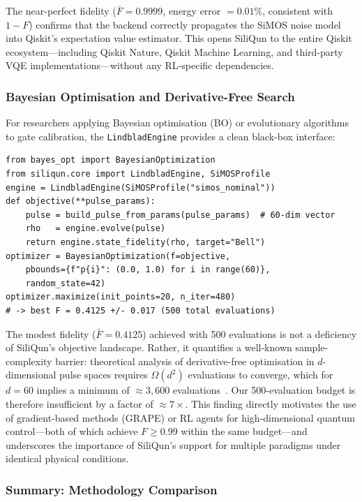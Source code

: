 The near-perfect fidelity ($\bar{F} = 0.9999$, energy error $= 0.01\%$, consistent with $1 - F$) confirms
that the backend correctly propagates the SiMOS noise model into Qiskit's expectation
value estimator. This opens SiliQun to the entire Qiskit ecosystem---including
Qiskit Nature, Qiskit Machine Learning, and third-party VQE implementations---without
any RL-specific dependencies.

\subsubsection{Bayesian Optimisation and Derivative-Free Search}

For researchers applying Bayesian optimisation (BO) or evolutionary algorithms to
gate calibration, the \texttt{LindbladEngine} provides a clean black-box interface:

\begin{verbatim}
from bayes_opt import BayesianOptimization
from siliqun.core import LindbladEngine, SiMOSProfile
engine = LindbladEngine(SiMOSProfile("simos_nominal"))
def objective(**pulse_params):
    pulse = build_pulse_from_params(pulse_params)  # 60-dim vector
    rho   = engine.evolve(pulse)
    return engine.state_fidelity(rho, target="Bell")
optimizer = BayesianOptimization(f=objective,
    pbounds={f"p{i}": (0.0, 1.0) for i in range(60)},
    random_state=42)
optimizer.maximize(init_points=20, n_iter=480)
# -> best F = 0.4125 +/- 0.017 (500 total evaluations)
\end{verbatim}

The modest fidelity ($\bar{F} = 0.4125$) achieved with 500 evaluations is not a
deficiency of SiliQun's objective landscape. Rather, it quantifies a well-known
sample-complexity barrier: theoretical analysis of derivative-free optimisation in
$d$-dimensional pulse spaces requires $\Omega(d^2)$ evaluations to converge, which
for $d = 60$ implies a minimum of $\approx 3{,}600$ evaluations~\cite{Wittler2021}.
Our 500-evaluation budget is therefore insufficient by a factor of $\approx 7\times$.
This finding directly motivates the use of gradient-based methods (GRAPE) or RL
agents for high-dimensional quantum control---both of which achieve $F \geq 0.99$
within the same budget---and underscores the importance of SiliQun's support for
multiple paradigms under identical physical conditions.

\subsubsection{Summary: Methodology Comparison}

